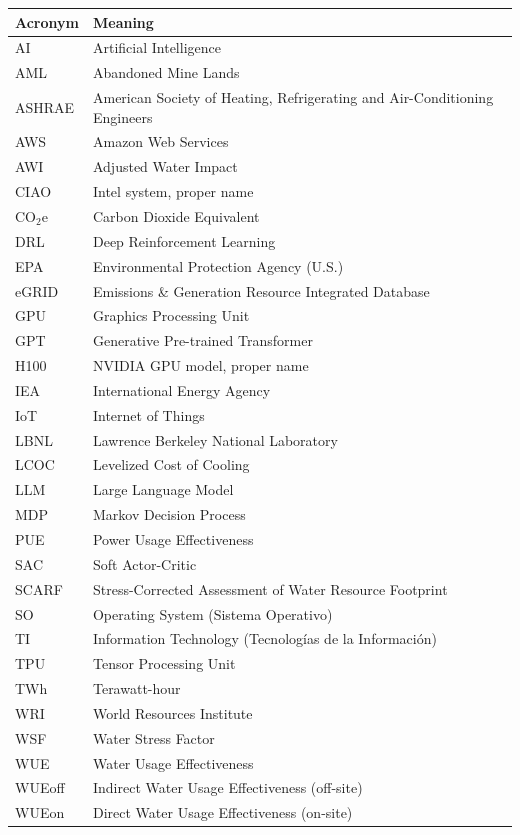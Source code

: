 \documentclass[conference]{IEEEtran}
\begin{document}
\begin{table}[h!]
\centering
\begin{tabularx}{\columnwidth}{@{}l>{\raggedright\arraybackslash}X@{}}
\toprule
\textbf{Acronym} & \textbf{Meaning} \\
\midrule
AI & Artificial Intelligence \\
AML & Abandoned Mine Lands \\
ASHRAE & American Society of Heating, Refrigerating and Air-Conditioning Engineers \\
AWS & Amazon Web Services \\
AWI & Adjusted Water Impact \\
CIAO & Intel system, proper name \\
CO$_2$e & Carbon Dioxide Equivalent \\
DRL & Deep Reinforcement Learning \\
EPA & Environmental Protection Agency (U.S.) \\
eGRID & Emissions \& Generation Resource Integrated Database \\
GPU & Graphics Processing Unit \\
GPT & Generative Pre-trained Transformer \\
H100 & NVIDIA GPU model, proper name \\
IEA & International Energy Agency \\
IoT & Internet of Things \\
LBNL & Lawrence Berkeley National Laboratory \\
LCOC & Levelized Cost of Cooling \\
LLM & Large Language Model \\
MDP & Markov Decision Process \\
PUE & Power Usage Effectiveness \\
SAC & Soft Actor-Critic \\
SCARF & Stress-Corrected Assessment of Water Resource Footprint \\
SO & Operating System (Sistema Operativo) \\
TI & Information Technology (Tecnologías de la Información) \\
TPU & Tensor Processing Unit \\
TWh & Terawatt-hour \\
WRI & World Resources Institute \\
WSF & Water Stress Factor \\
WUE & Water Usage Effectiveness \\
WUEoff & Indirect Water Usage Effectiveness (off-site) \\
WUEon & Direct Water Usage Effectiveness (on-site) \\
\bottomrule
\end{tabularx}
\end{table}
\end{document}
